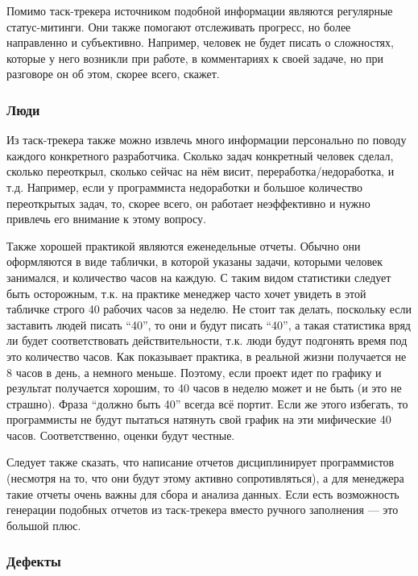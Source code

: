 \documentclass{../../text-style}
\begin{document}
Помимо таск-трекера источником подобной информации являются регулярные статус-митинги. Они также помогают отслеживать прогресс, но более направленно и субъективно. Например, человек не будет писать о сложностях, которые у него возникли при работе, в комментариях к своей задаче, но при разговоре он об этом, скорее всего, скажет.

\subsubsection{Люди}

Из таск-трекера также можно извлечь много информации персонально по поводу каждого конкретного разработчика. Сколько задач конкретный человек сделал, сколько переоткрыл, сколько сейчас на нём висит, переработка/недоработка, и т.д. Например, если у программиста недоработки и большое количество переоткрытых задач, то, скорее всего, он работает неэффективно и нужно привлечь его внимание к этому вопросу.

Также хорошей практикой являются еженедельные отчеты. Обычно они оформляются в виде таблички, в которой указаны задачи, которыми человек занимался, и количество часов на каждую. С таким видом статистики следует быть осторожным, т.к. на практике менеджер часто хочет увидеть в этой табличке строго 40 рабочих часов за неделю. Не стоит так делать, поскольку если заставить людей писать \enquote{40}, то они и будут писать \enquote{40}, а такая статистика вряд ли будет соответствовать действительности, т.к. люди будут подгонять время под это количество часов. Как показывает практика, в реальной жизни получается не 8 часов в день, а немного меньше. Поэтому, если проект идет по графику и результат получается хорошим, то 40 часов в неделю может и не быть (и это не страшно). Фраза \enquote{должно быть 40} всегда всё портит. Если же этого избегать, то программисты не будут пытаться натянуть свой график на эти мифические 40 часов. Соответственно, оценки будут честные.

Следует также сказать, что написание отчетов дисциплинирует программистов (несмотря на то, что они будут этому активно сопротивляться), а для менеджера такие отчеты очень важны для сбора и анализа данных. Если есть возможность генерации подобных отчетов из таск-трекера вместо ручного заполнения --- это большой плюс.

\subsubsection{Дефекты}
\end{document}
